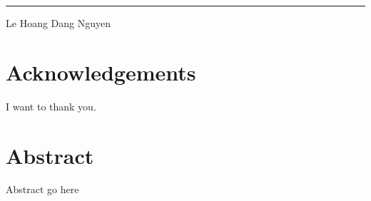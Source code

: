 \documentclass[12pt,twoside]{report}
\begin{document}
\vspace{12cm}  %

\noindent\hfill\rule{8cm}{0.4pt}  %
\vspace{0.5cm} %

\noindent\hspace{8cm} Le Hoang Dang Nguyen %

\chapter*{\centering Acknowledgements}
I want to thank you.

\chapter*{\centering Abstract}
Abstract go here

\tableofcontents









\printbibliography[title={References}]
\end{document}
